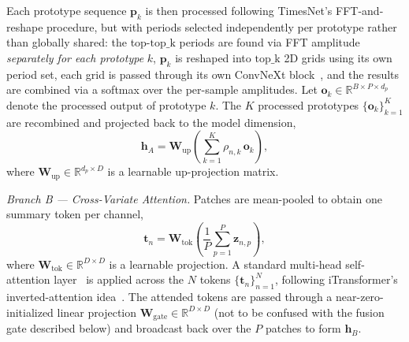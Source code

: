 \documentclass[10pt,journal]{IEEEtran}
\begin{document}
Each prototype sequence $\bm{p}_k$ is then processed following TimesNet's FFT-and-reshape procedure, but with periods selected independently per prototype rather than globally shared: the top-$\mathrm{top\_k}$ periods are found via FFT amplitude \emph{separately for each prototype} $k$, $\bm{p}_k$ is reshaped into $\mathrm{top\_k}$ 2D grids using its own period set, each grid is passed through its own ConvNeXt block~\cite{convnext}, and the results are combined via a softmax over the per-sample amplitudes. Let $\bm{o}_k \in \mathbb{R}^{B \times P \times d_p}$ denote the processed output of prototype $k$. The $K$ processed prototypes $\{\bm{o}_k\}_{k=1}^{K}$ are recombined and projected back to the model dimension,
\begin{equation}
\label{eq:branch_a_output}
\bm{h}_A = \bm{W}_{\mathrm{up}} \left(\sum_{k=1}^{K} \rho_{n,k}\, \bm{o}_k\right),
\end{equation}
where $\bm{W}_{\mathrm{up}} \in \mathbb{R}^{d_p \times D}$ is a learnable up-projection matrix.

\emph{Branch B --- Cross-Variate Attention.} Patches are mean-pooled to obtain one summary token per channel,
\begin{equation}
\label{eq:branch_b_token}
\bm{t}_n = \bm{W}_{\mathrm{tok}} \left(\frac{1}{P}\sum_{p=1}^{P} \bm{z}_{n,p}\right),
\end{equation}
where $\bm{W}_{\mathrm{tok}} \in \mathbb{R}^{D \times D}$ is a learnable projection. A standard multi-head self-attention layer~\cite{attention} is applied across the $N$ tokens $\{\bm{t}_n\}_{n=1}^{N}$, following iTransformer's inverted-attention idea~\cite{itransformer}. The attended tokens are passed through a near-zero-initialized linear projection $\bm{W}_{\mathrm{gate}} \in \mathbb{R}^{D \times D}$ (not to be confused with the fusion gate described below) and broadcast back over the $P$ patches to form $\bm{h}_B$.
\end{document}
